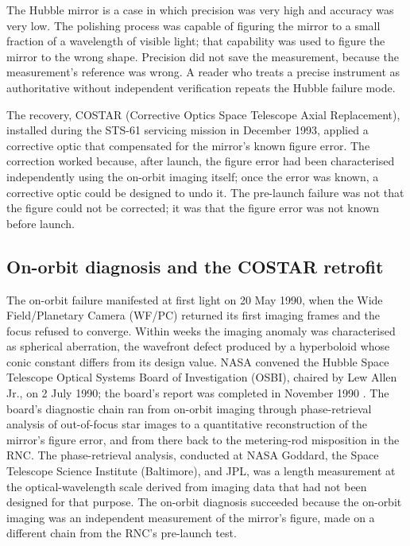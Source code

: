 The Hubble mirror is a case in which precision was very high and
accuracy was very low. The polishing process was capable of figuring
the mirror to a small fraction of a wavelength of visible light;
that capability was used to figure the mirror to the wrong shape.
Precision did not save the measurement, because the measurement's
reference was wrong. A reader who treats a precise instrument as
authoritative without independent verification repeats the Hubble
failure mode.

The recovery, COSTAR (Corrective Optics Space Telescope Axial
Replacement), installed during the STS-61 servicing mission in
December 1993, applied a corrective optic that compensated for the
mirror's known figure error. The correction worked because, after
launch, the figure error had been characterised independently using
the on-orbit imaging itself; once the error was known, a corrective
optic could be designed to undo it. The pre-launch failure was not
that the figure could not be corrected; it was that the figure
error was not known before launch.

\subsection{On-orbit diagnosis and the COSTAR retrofit}

The on-orbit failure manifested at first light on 20 May 1990,
when the Wide Field/Planetary Camera (WF/PC) returned its first
imaging frames and the focus refused to converge. Within weeks
the imaging anomaly was characterised as spherical aberration, the
wavefront defect produced by a hyperboloid whose conic constant
differs from its design value. NASA convened the Hubble Space
Telescope Optical Systems Board of Investigation (OSBI), chaired
by Lew Allen Jr., on 2 July 1990; the board's report was completed
in November 1990 \cite{acc:nasa-hubble-optical-systems-1990}. The
board's diagnostic chain ran from on-orbit imaging through
phase-retrieval analysis of out-of-focus star images to a
quantitative reconstruction of the mirror's figure error, and from
there back to the metering-rod misposition in the RNC. The
phase-retrieval analysis, conducted at NASA Goddard, the Space
Telescope Science Institute (Baltimore), and JPL, was a length
measurement at the optical-wavelength scale derived from imaging
data that had not been designed for that purpose. The on-orbit
diagnosis succeeded because the on-orbit imaging was an independent
measurement of the mirror's figure, made on a different chain from
the RNC's pre-launch test.

